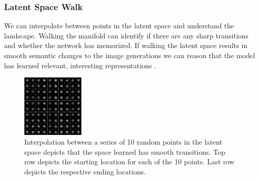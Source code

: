 \documentclass{article}
\newcommand{\squeezeup}{\vspace{-2.5mm}}
\begin{document}
\subsubsection{Latent Space Walk}
\label{sec:gansubsubhead2}
\squeezeup
We can interpolate between points in the latent space and understand the landscape. Walking the manifold can identify if there are any sharp transitions and whether the network has memorized. If walking the latent space results in smooth semantic changes to the image generations we can reason that the model has learned relevant, interesting representations \cite{DBLP:journals/corr/RadfordMC15}.
\squeezeup
\squeezeup
\begin{figure}[htb]
\vspace{-0.2cm}
\begin{minipage}[b]{1.0\linewidth}
  \centering
  \centerline{\includegraphics[width=3cm]{latent_space_walk}}
  \vspace{-0.3cm}
\end{minipage}
\caption{Interpolation between a series of 10 random points in the latent space depicts
that the space learned has smooth transitions. Top row depicts the starting location for each
of the 10 points. Last row depicts the respective ending locations.}
\label{fig:res3}
\vspace{-0.5cm}
\end{figure}
\squeezeup
\vspace{-0.25cm}
\end{document}
